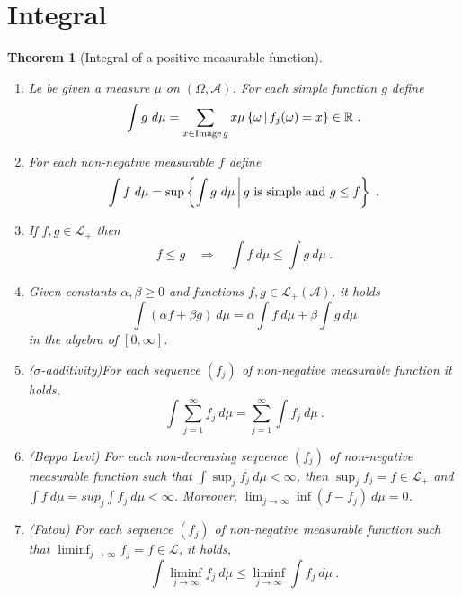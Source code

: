 \documentclass[12pt,a4paper]{amsart}
\theoremstyle{plain}
\newtheorem{theorem}{Theorem}%
\theoremstyle{definition}
\theoremstyle{remark}
\begin{document}
\section{Integral}
\label{sec:integrals}

\begin{theorem}[Integral of a positive measurable function]
\begin{enumerate}
\item Le be given a measure $\mu$ on $(\Omega,\mathcal A)$.  For each
  simple function $g$ define
  \begin{equation*}
    \int g \ d\mu = \sum_{x \in
      \operatorname{Image} g} x \mu\left\{\omega \, \middle| \, f_j(\omega) = x \right\}
    \in \mathbb{R} \ .  
  \end{equation*}
\item For each non-negative measurable $f$ define
  \begin{equation*}
    \int f \ d\mu = \sup \setof{\int g \ d\mu}{\text{$g$ is simple and
      $g \leq f$}} \ .
  \end{equation*}
\item If $f, g \in \mathcal L_+$ then
  \begin{equation*}
    f \leq g \quad \Rightarrow \quad \int f \ d\mu \leq \int g \ d\mu \ .
  \end{equation*}
\item Given constants $\alpha,\beta \geq 0$ and functions $f,g \in
  \mathcal L_+(\mathcal A)$, it holds
  \begin{equation*}
    \int (\alpha f + \beta g) \ d\mu = \alpha \int f \ d\mu + \beta
    \int g \ d\mu
  \end{equation*}
in the algebra of $[0,\infty]$. 
\item (\emph{$\sigma$-additivity})For each sequence $(f_j)$ of non-negative measurable function
  it holds,
  \begin{equation*}
    \int \sum_{j=1}^\infty f_j \ d\mu = \sum_{j=1}^\infty  \int f_j \ d\mu \ .
  \end{equation*}
\item (\emph{Beppo Levi}) For each non-decreasing sequence $(f_j)$ of non-negative measurable function
  such that $\int \sup_{j} f_j \ d\mu < \infty$, then $\sup_j f_j = f
  \in \mathcal L_+$ and $\int f \ d\mu = sup_j \int f_j \ d\mu <
  \infty$. Moreover, $\lim_{j \to \infty} \inf (f - f_j) \ d\mu = 0$.  
\item (\emph{Fatou}) For each sequence $(f_j)$ of non-negative measurable function
  such that $\liminf_{j\to\infty} f_j = f \in \mathcal L$, it  holds,
  \begin{equation*}
    \int \liminf_{j \to \infty} f_j \ d\mu \leq \liminf_{j \to \infty}
    \int f_j \ d\mu \ .
  \end{equation*}
\end{enumerate}
\end{theorem}
\end{document}
